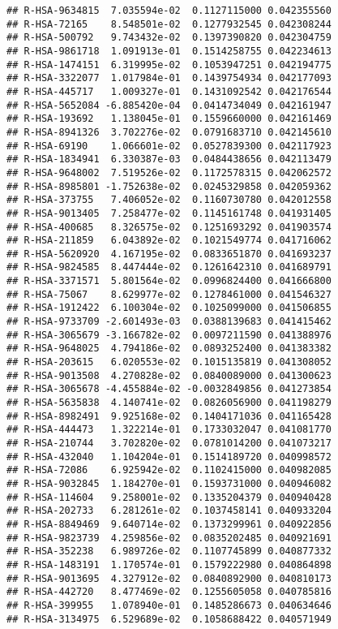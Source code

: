 \documentclass[
]{article}
\begin{document}
\begin{verbatim}
## R-HSA-9634815  7.035594e-02  0.1127115000 0.042355560
## R-HSA-72165    8.548501e-02  0.1277932545 0.042308244
## R-HSA-500792   9.743432e-02  0.1397390820 0.042304759
## R-HSA-9861718  1.091913e-01  0.1514258755 0.042234613
## R-HSA-1474151  6.319995e-02  0.1053947251 0.042194775
## R-HSA-3322077  1.017984e-01  0.1439754934 0.042177093
## R-HSA-445717   1.009327e-01  0.1431092542 0.042176544
## R-HSA-5652084 -6.885420e-04  0.0414734049 0.042161947
## R-HSA-193692   1.138045e-01  0.1559660000 0.042161469
## R-HSA-8941326  3.702276e-02  0.0791683710 0.042145610
## R-HSA-69190    1.066601e-02  0.0527839300 0.042117923
## R-HSA-1834941  6.330387e-03  0.0484438656 0.042113479
## R-HSA-9648002  7.519526e-02  0.1172578315 0.042062572
## R-HSA-8985801 -1.752638e-02  0.0245329858 0.042059362
## R-HSA-373755   7.406052e-02  0.1160730780 0.042012558
## R-HSA-9013405  7.258477e-02  0.1145161748 0.041931405
## R-HSA-400685   8.326575e-02  0.1251693292 0.041903574
## R-HSA-211859   6.043892e-02  0.1021549774 0.041716062
## R-HSA-5620920  4.167195e-02  0.0833651870 0.041693237
## R-HSA-9824585  8.447444e-02  0.1261642310 0.041689791
## R-HSA-3371571  5.801564e-02  0.0996824400 0.041666800
## R-HSA-75067    8.629977e-02  0.1278461000 0.041546327
## R-HSA-1912422  6.100304e-02  0.1025099000 0.041506855
## R-HSA-9733709 -2.601493e-03  0.0388139683 0.041415462
## R-HSA-3065679 -3.166782e-02  0.0097211590 0.041388976
## R-HSA-9648025  4.794186e-02  0.0893252400 0.041383382
## R-HSA-203615   6.020553e-02  0.1015135819 0.041308052
## R-HSA-9013508  4.270828e-02  0.0840089000 0.041300623
## R-HSA-3065678 -4.455884e-02 -0.0032849856 0.041273854
## R-HSA-5635838  4.140741e-02  0.0826056900 0.041198279
## R-HSA-8982491  9.925168e-02  0.1404171036 0.041165428
## R-HSA-444473   1.322214e-01  0.1733032047 0.041081770
## R-HSA-210744   3.702820e-02  0.0781014200 0.041073217
## R-HSA-432040   1.104204e-01  0.1514189720 0.040998572
## R-HSA-72086    6.925942e-02  0.1102415000 0.040982085
## R-HSA-9032845  1.184270e-01  0.1593731000 0.040946082
## R-HSA-114604   9.258001e-02  0.1335204379 0.040940428
## R-HSA-202733   6.281261e-02  0.1037458141 0.040933204
## R-HSA-8849469  9.640714e-02  0.1373299961 0.040922856
## R-HSA-9823739  4.259856e-02  0.0835202485 0.040921691
## R-HSA-352238   6.989726e-02  0.1107745899 0.040877332
## R-HSA-1483191  1.170574e-01  0.1579222980 0.040864898
## R-HSA-9013695  4.327912e-02  0.0840892900 0.040810173
## R-HSA-442720   8.477469e-02  0.1255605058 0.040785816
## R-HSA-399955   1.078940e-01  0.1485286673 0.040634646
## R-HSA-3134975  6.529689e-02  0.1058688422 0.040571949

\end{verbatim}
\end{document}
